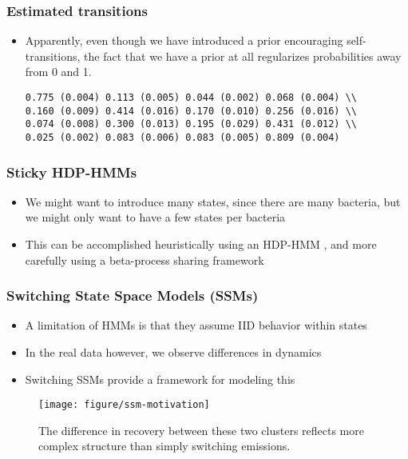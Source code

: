 \documentclass{beamer}
\begin{document}
\begin{frame}
  \frametitle{Estimated transitions}
  \begin{itemize}
    \item Apparently, even though we have introduced a prior encouraging
      self-transitions, the fact that we have a prior at all regularizes
      probabilities away from 0 and 1.
\begin{verbatim} 
0.775 (0.004) 0.113 (0.005) 0.044 (0.002) 0.068 (0.004) \\
0.160 (0.009) 0.414 (0.016) 0.170 (0.010) 0.256 (0.016) \\ 
0.074 (0.008) 0.300 (0.013) 0.195 (0.029) 0.431 (0.012) \\
0.025 (0.002) 0.083 (0.006) 0.083 (0.005) 0.809 (0.004) 
\end{verbatim}
  \end{itemize}
\end{frame}

\begin{frame}
  \frametitle{Sticky HDP-HMMs}
 \begin{itemize}
 \item We might want to introduce many states, since there are many bacteria,
   but we might only want to have a few states per bacteria
 \item This can be accomplished heuristically using an HDP-HMM \citep{fox2007sticky}, and more
   carefully using a beta-process sharing framework \citep{fox2009sharing}
 \end{itemize} 
\end{frame}

\begin{frame}
  \frametitle{Switching State Space Models (SSMs)}
 \begin{itemize}
 \item A limitation of HMMs is that they assume IID behavior within states
 \item In the real data however, we observe differences in dynamics
 \item Switching SSMs provide a framework for modeling this \citep{ghahramani2000variational}
 \end{itemize} 

\begin{figure}[ht]
  \centering
  \texttt{[image: figure/ssm-motivation]}
  \caption{The difference in recovery between these two clusters reflects more
    complex structure than simply switching
    emissions. \label{fig:ssm-motivation}}
\end{figure}

\end{frame}
\end{document}
